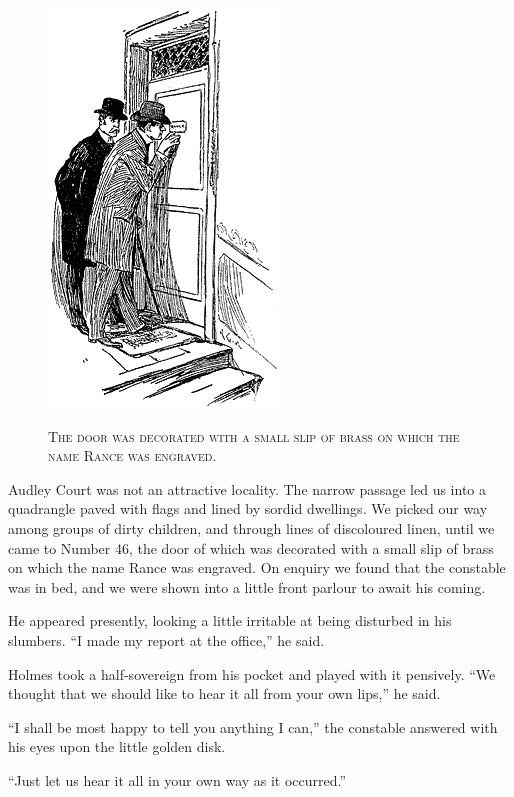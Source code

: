 \documentclass[12pt,english]{book}
\newcommand{\noun}[1]{\textsc{#1}}
\begin{document}
%
\begin{figure}[htbp]
\noindent \begin{center}\includegraphics{images/study10-stud-07.png}\end{center}

\noindent \begin{center}\noun{The door was decorated with a small
slip of brass on which the name Rance was engraved.}\end{center}
\end{figure}
Audley Court was not an attractive locality. The narrow passage led
us into a quadrangle paved with flags and lined by sordid dwellings.
We picked our way among groups of dirty children, and through lines
of discoloured linen, until we came to Number 46, the door of which
was decorated with a small slip of brass on which the name Rance was
engraved. On enquiry we found that the constable was in bed, and we
were shown into a little front parlour to await his coming.

He appeared presently, looking a little irritable at being disturbed
in his slumbers. {}``I made my report at the office,'' he said.

Holmes took a half-sovereign from his pocket and played with it pensively.
{}``We thought that we should like to hear it all from your own lips,''
he said.

{}``I shall be most happy to tell you anything I can,'' the constable
answered with his eyes upon the little golden disk.

{}``Just let us hear it all in your own way as it occurred.''
\end{document}
